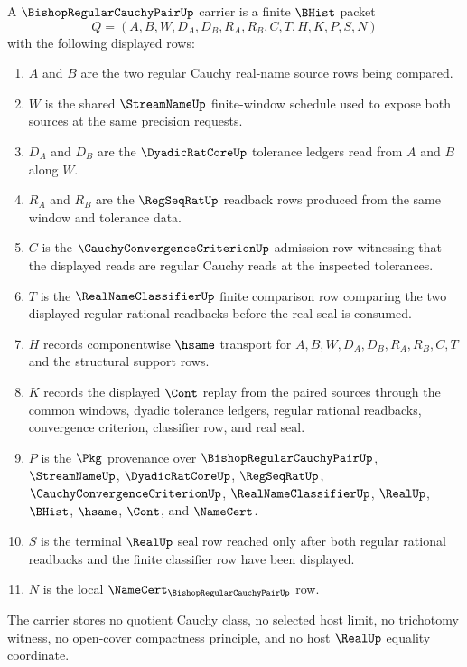 \begin{definition}
\label{def:bishopregularcauchypair-carrier}
A $\BishopRegularCauchyPairUp$ carrier is a finite $\BHist$ packet
$$
Q=(A,B,W,D_A,D_B,R_A,R_B,C,T,H,K,P,S,N)
$$
with the following displayed rows:
\begin{enumerate}
\item $A$ and $B$ are the two regular Cauchy real-name source rows being compared.
\item $W$ is the shared $\StreamNameUp$ finite-window schedule used to expose both sources at the same precision requests.
\item $D_A$ and $D_B$ are the $\DyadicRatCoreUp$ tolerance ledgers read from $A$ and $B$ along $W$.
\item $R_A$ and $R_B$ are the $\RegSeqRatUp$ readback rows produced from the same window and tolerance data.
\item $C$ is the $\CauchyConvergenceCriterionUp$ admission row witnessing that the displayed reads are regular Cauchy reads at the inspected tolerances.
\item $T$ is the $\RealNameClassifierUp$ finite comparison row comparing the two displayed regular rational readbacks before the real seal is consumed.
\item $H$ records componentwise $\hsame$ transport for $A,B,W,D_A,D_B,R_A,R_B,C,T$ and the structural support rows.
\item $K$ records the displayed $\Cont$ replay from the paired sources through the common windows, dyadic tolerance ledgers, regular rational readbacks, convergence criterion, classifier row, and real seal.
\item $P$ is the $\Pkg$ provenance over $\BishopRegularCauchyPairUp$, $\StreamNameUp$, $\DyadicRatCoreUp$, $\RegSeqRatUp$, $\CauchyConvergenceCriterionUp$, $\RealNameClassifierUp$, $\RealUp$, $\BHist$, $\hsame$, $\Cont$, and $\NameCert$.
\item $S$ is the terminal $\RealUp$ seal row reached only after both regular rational readbacks and the finite classifier row have been displayed.
\item $N$ is the local $\NameCert_{\BishopRegularCauchyPairUp}$ row.
\end{enumerate}
The carrier stores no quotient Cauchy class, no selected host limit, no trichotomy witness, no open-cover compactness principle, and no host $\RealUp$ equality coordinate.
\end{definition}

